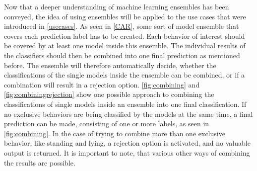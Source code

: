 Now that a deeper understanding of machine learning ensembles has been conveyed, the idea of using ensembles will be applied to the use cases that were introduced in \autoref{usecases}. As seen in \autoref{CAR}, some sort of model ensemble that covers each prediction label has to be created. Each behavior of interest should be covered by at least one model inside this ensemble. The individual results of the classifiers should then be combined into one final prediction as mentioned before. The ensemble will therefore automatically decide, whether the classifications of the single models inside the ensemble can be combined, or if a combination will result in a rejection option. \autoref{fig:combining} and \autoref{fig:combiningrejection} show one possible approach to combining the classifications of single models inside an ensemble into one final classification. If no exclusive behaviors are being classified by the models at the same time, a final prediction can be made, consisting of one or more labels, as seen in \autoref{fig:combining}. In the case of trying to combine more than one exclusive behavior, like standing and lying, a rejection option is activated, and no valuable output is returned. It is important to note, that various other ways of combining the results are possible.



